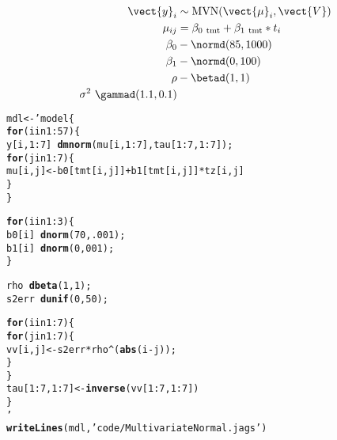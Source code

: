 \documentclass[12pt,letterpaper,oneside]{article}\usepackage{graphicx, color}
\makeatletter
\newcommand{\hlfunctioncall}[1]{\textcolor[rgb]{0.501960784313725,0,0.329411764705882}{\textbf{#1}}}%
\newcommand{\hlstring}[1]{\textcolor[rgb]{0.6,0.6,1}{#1}}%
\newenvironment{kframe}{%
 \def\at@end@of@kframe{}%
 \ifinner\ifhmode%
  \def\at@end@of@kframe{\end{minipage}}%
  \begin{minipage}{\columnwidth}%
 \fi\fi%
 \def\FrameCommand##1{\hskip\@totalleftmargin \hskip-\fboxsep
 \colorbox{shadecolor}{##1}\hskip-\fboxsep
     \hskip-\linewidth \hskip-\@totalleftmargin \hskip\columnwidth}%
 \MakeFramed {\advance\hsize-\width
   \@totalleftmargin\z@ \linewidth\hsize
   \@setminipage}}%
 {\par\unskip\endMakeFramed%
 \at@end@of@kframe}
\newenvironment{knitrout}{}{} %
\makeatother
\begin{document}
\begin{align*}
    \vect{y}_{i}&\sim \text{MVN}(\vect{\mu}_{i}, \vect{V})\\
    \mu_{ij} &= \beta_{0~{\tiny\text{tmt}}} + \beta_{1~{\tiny\text{tmt}}} * t_{i}\\
    \beta_{0} &- \normd(85, 1000)\\
    \beta_{1} &- \normd(0, 100)\\
    \rho &- \betad(1, 1)\\
    \sigma^{2} ~ \gammad(1.1, 0.1)\\
\end{align*}

\begin{knitrout}\scriptsize
{}\color{fgcolor}\begin{kframe}
\begin{alltt}
mdl <- 'model\{
    \hlfunctioncall{for} (i in 1:57) \{
        y[i, 1:7] ~ \hlfunctioncall{dmnorm}(mu[i, 1:7], tau[1:7,1:7]);
        \hlfunctioncall{for} (j in 1:7) \{
            mu[i, j] <- b0[tmt[i, j]] + b1[tmt[i, j]]*tz[i, j]
        \}
    \}

    \hlfunctioncall{for} (i in 1:3)\{
        b0[i] ~ \hlfunctioncall{dnorm}(70, .001);
        b1[i] ~ \hlfunctioncall{dnorm}(0, 001);
    \}

    rho ~ \hlfunctioncall{dbeta}(1,1);
    s2err ~ \hlfunctioncall{dunif}(0,50);

    \hlfunctioncall{for}(i in 1:7)\{
        \hlfunctioncall{for}( j in 1:7)\{
            vv[i, j] <- s2err*rho^(\hlfunctioncall{abs}(i-j));
        \}
    \}
    tau[1:7, 1:7] <- \hlfunctioncall{inverse}(vv[1:7, 1:7])
\}
'
\hlfunctioncall{writeLines}(mdl, \hlstring{'code/MultivariateNormal.jags'})
\end{alltt}
\end{kframe}
\end{knitrout}
\end{document}

